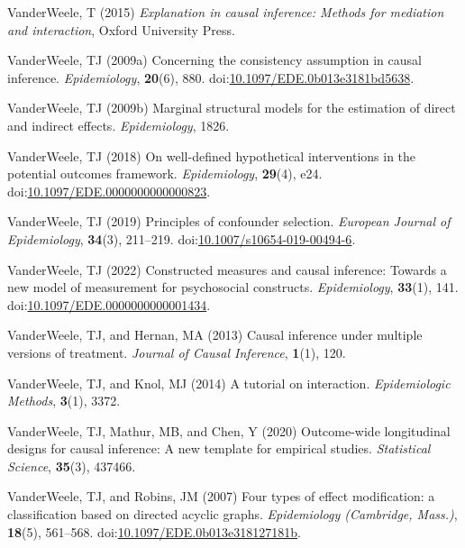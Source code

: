 \documentclass[
  singlecolumn,
  9pt]{article}
\newlength{\cslhangindent}
\newenvironment{CSLReferences}[2] %
 {\begin{list}{}{%
  \setlength{\itemindent}{0pt}
  \setlength{\leftmargin}{0pt}
  \setlength{\parsep}{0pt}
  \ifodd #1
   \setlength{\leftmargin}{\cslhangindent}
   \setlength{\itemindent}{-1\cslhangindent}
  \fi
  \setlength{\itemsep}{#2\baselineskip}}}
 {\end{list}}
\begin{document}
\begin{CSLReferences}{1}{0}
VanderWeele, T (2015) \emph{Explanation in causal inference: Methods for
mediation and interaction}, Oxford University Press.

VanderWeele, TJ (2009a) Concerning the consistency assumption in causal
inference. \emph{Epidemiology}, \textbf{20}(6), 880.
doi:\href{https://doi.org/10.1097/EDE.0b013e3181bd5638}{10.1097/EDE.0b013e3181bd5638}.

VanderWeele, TJ (2009b) Marginal structural models for the estimation of
direct and indirect effects. \emph{Epidemiology}, 1826.

VanderWeele, TJ (2018) On well-defined hypothetical interventions in the
potential outcomes framework. \emph{Epidemiology}, \textbf{29}(4), e24.
doi:\href{https://doi.org/10.1097/EDE.0000000000000823}{10.1097/EDE.0000000000000823}.

VanderWeele, TJ (2019) Principles of confounder selection.
\emph{European Journal of Epidemiology}, \textbf{34}(3), 211--219.
doi:\href{https://doi.org/10.1007/s10654-019-00494-6}{10.1007/s10654-019-00494-6}.

VanderWeele, TJ (2022) Constructed measures and causal inference:
Towards a new model of measurement for psychosocial constructs.
\emph{Epidemiology}, \textbf{33}(1), 141.
doi:\href{https://doi.org/10.1097/EDE.0000000000001434}{10.1097/EDE.0000000000001434}.

VanderWeele, TJ, and Hernan, MA (2013) Causal inference under multiple
versions of treatment. \emph{Journal of Causal Inference},
\textbf{1}(1), 120.

VanderWeele, TJ, and Knol, MJ (2014) A tutorial on interaction.
\emph{Epidemiologic Methods}, \textbf{3}(1), 3372.

VanderWeele, TJ, Mathur, MB, and Chen, Y (2020) Outcome-wide
longitudinal designs for causal inference: A new template for empirical
studies. \emph{Statistical Science}, \textbf{35}(3), 437466.

VanderWeele, TJ, and Robins, JM (2007) Four types of effect
modification: a classification based on directed acyclic graphs.
\emph{Epidemiology (Cambridge, Mass.)}, \textbf{18}(5), 561--568.
doi:\href{https://doi.org/10.1097/EDE.0b013e318127181b}{10.1097/EDE.0b013e318127181b}.


\end{CSLReferences}
\end{document}
